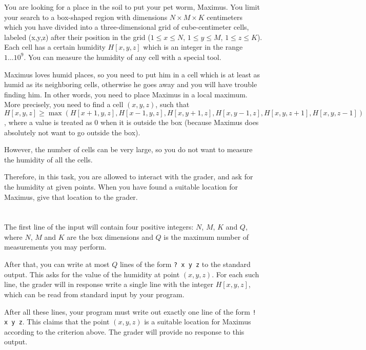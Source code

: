 \ifx\boi\undefined\fi
\def\version{jury-draft}

You are looking for a place in the soil to put your pet worm, Maximus. You limit your search to a box-shaped region with dimensions $N \times M \times K$ centimeters which you have divided into a three-dimensional grid of cube-centimeter cells, labeled (x,y,z) after their position in the grid ($1 \le x \le N$, $1 \le y \le M$, $1 \le z \le K$). Each cell has a certain humidity $H[x,y,z]$ which is an integer in the range $1 \dots 10^9$. You can measure the humidity of any cell with a special tool.  

Maximus loves humid places, so you need to put him in a cell which is at least as humid as its neighboring cells, otherwise he goes away and you will have trouble finding him. In other words, you need to place Maximus in a local maximum. More precisely, you need to find a cell $(x,y,z)$, such that $H[x,y,z] \ge \max(H[x+1, y, z], H[x-1,y,z], H[x,y+1,z], H[x,y-1,z],H[x,y,z+1],H[x,y,z-1] )$, where a value is treated as $0$ when it is outside the box (because Maximus does absolutely not want to go outside the box).

However, the number of cells can be very large, so you do not want to measure the humidity of all the cells.

Therefore, in this task, you are allowed to interact with the grader, and ask for the humidity at given points.
When you have found a suitable location for Maximus, give that location to the grader.

\section*{\interactivity}
The first line of the input will contain four positive integers: $N$, $M$, $K$ and $Q$, where $N$, $M$ and $K$ are the box dimensions and $Q$ is the maximum number of measurements you may perform.

After that, you can write at most $Q$ lines of the form \texttt{? x y z} to the standard output.
This asks for the value of the humidity at point $(x, y, z)$.
For each such line, the grader will in response write a single line with the integer $H[x,y,z]$, which can be read from standard input by your program.

After all these lines, your program must write out exactly one line of the form \texttt{! x y z}.
This claims that the point $(x, y, z)$ is a suitable location for Maximus according to the criterion above.
The grader will provide no response to this output.

